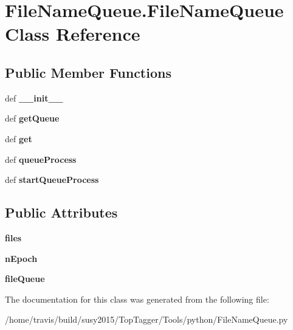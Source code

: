\hypertarget{classFileNameQueue_1_1FileNameQueue}{\section{File\-Name\-Queue.\-File\-Name\-Queue Class Reference}
\label{classFileNameQueue_1_1FileNameQueue}
}
\subsection*{Public Member Functions}
\begin{DoxyCompactItemize}
\item 
\hypertarget{classFileNameQueue_1_1FileNameQueue_aea39c38145599ec2d9bec31ac8cef68a}{def {\bfseries \-\_\-\-\_\-init\-\_\-\-\_\-}}\label{classFileNameQueue_1_1FileNameQueue_aea39c38145599ec2d9bec31ac8cef68a}

\item 
\hypertarget{classFileNameQueue_1_1FileNameQueue_a91c5b679677cc9664dd2c16822d042e1}{def {\bfseries get\-Queue}}\label{classFileNameQueue_1_1FileNameQueue_a91c5b679677cc9664dd2c16822d042e1}

\item 
\hypertarget{classFileNameQueue_1_1FileNameQueue_aa0fad18a33d8a60e45fb56b808011667}{def {\bfseries get}}\label{classFileNameQueue_1_1FileNameQueue_aa0fad18a33d8a60e45fb56b808011667}

\item 
\hypertarget{classFileNameQueue_1_1FileNameQueue_af9c7379a4367c2ca928c7a63266e5ff5}{def {\bfseries queue\-Process}}\label{classFileNameQueue_1_1FileNameQueue_af9c7379a4367c2ca928c7a63266e5ff5}

\item 
\hypertarget{classFileNameQueue_1_1FileNameQueue_a3655c497dd707c8681369cd70b4272c3}{def {\bfseries start\-Queue\-Process}}\label{classFileNameQueue_1_1FileNameQueue_a3655c497dd707c8681369cd70b4272c3}

\end{DoxyCompactItemize}
\subsection*{Public Attributes}
\begin{DoxyCompactItemize}
\item 
\hypertarget{classFileNameQueue_1_1FileNameQueue_a7ab700eeebb00f7b586ff3ca7299b016}{{\bfseries files}}\label{classFileNameQueue_1_1FileNameQueue_a7ab700eeebb00f7b586ff3ca7299b016}

\item 
\hypertarget{classFileNameQueue_1_1FileNameQueue_ad4cac71c6ecb2d22c2e00b1b80cafd0c}{{\bfseries n\-Epoch}}\label{classFileNameQueue_1_1FileNameQueue_ad4cac71c6ecb2d22c2e00b1b80cafd0c}

\item 
\hypertarget{classFileNameQueue_1_1FileNameQueue_af94c59d51930e68104548a831501f746}{{\bfseries file\-Queue}}\label{classFileNameQueue_1_1FileNameQueue_af94c59d51930e68104548a831501f746}

\end{DoxyCompactItemize}


The documentation for this class was generated from the following file\-:\begin{DoxyCompactItemize}
\item 
/home/travis/build/susy2015/\-Top\-Tagger/\-Tools/python/File\-Name\-Queue.\-py\end{DoxyCompactItemize}
